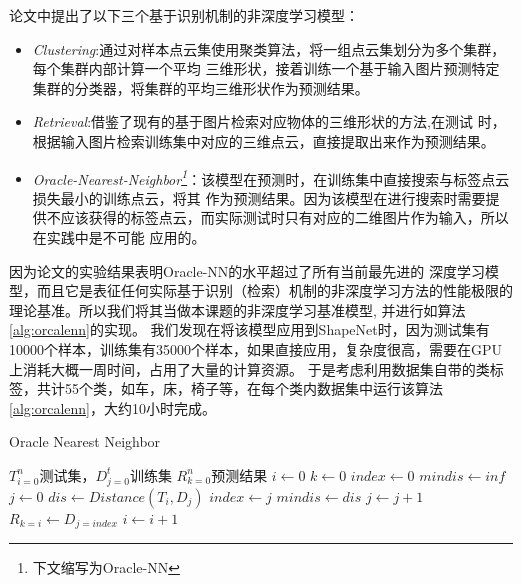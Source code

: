 \documentclass[bachelor, nocolorlinks, printoneside]{seuthesis} %
\begin{document}
\begin{Main}
论文\cite{tatarchenko2019single}中提出了以下三个基于识别机制的非深度学习模型：
\begin{itemize}
    \item \textit{Clustering}:通过对样本点云集使用聚类算法，将一组点云集划分为多个集群，每个集群内部计算一个平均
    三维形状，接着训练一个基于输入图片预测特定集群的分类器，将集群的平均三维形状作为预测结果。
    \item \textit{Retrieval}:借鉴了现有的基于图片检索对应物体的三维形状的方法\cite{10.1145/2816795.2818071},在测试
    时，根据输入图片检索训练集中对应的三维点云，直接提取出来作为预测结果。
    \item \textit{Oracle-Nearest-Neighbor\footnote[1]{下文缩写为Oracle-NN}}：该模型在预测时，在训练集中直接搜索与标签点云损失最小的训练点云，将其
    作为预测结果。因为该模型在进行搜索时需要提供不应该获得的标签点云，而实际测试时只有对应的二维图片作为输入，所以在实践中是不可能
    应用的。
\end{itemize}

因为论文\cite{tatarchenko2019single}的实验结果表明Oracle-NN的水平超过了所有当前最先进的
深度学习模型，而且它是表征任何实际基于识别（检索）机制的非深度学习方法的性能极限的理论基准。所以我们将其当做本课题的非深度学习基准模型, 并进行如算法\ref{alg:orcalenn}的实现。
我们发现在将该模型应用到ShapeNet时，因为测试集有10000个样本，训练集有35000个样本，如果直接应用，复杂度很高，需要在GPU上消耗大概一周时间，占用了大量的计算资源。
于是考虑利用数据集自带的类标签，共计55个类，如车，床，椅子等，在每个类内数据集中运行该算法\ref{alg:orcalenn}，大约10小时完成。

\begin{algorithm}
    \caption{Oracle Nearest Neighbor}
    \label{alg:orcalenn}
    \begin{algorithmic}[1] %
        \Require ${T^{n}_{i=0}}$测试集，${D^{t}_{j=0}}$训练集
        \Ensure ${R^{n}_{k=0}}$预测结果
        \State $i \gets 0$
        \State $k \gets 0$
            \State $index \gets 0$
            \State $mindis \gets inf$
            \State $j \gets 0$
                \State $dis \gets Distance(T_i, D_j)$
                        \State $index \gets j$
                        \State $mindis \gets dis$
                    \EndIf
                \State $j \gets j+1$
            \EndWhile
        \State $R_{k=i} \gets D_{j=index}$
        \State $i \gets i+1$
        \EndWhile
    \end{algorithmic}
\end{algorithm}


\end{Main}
\end{document}
